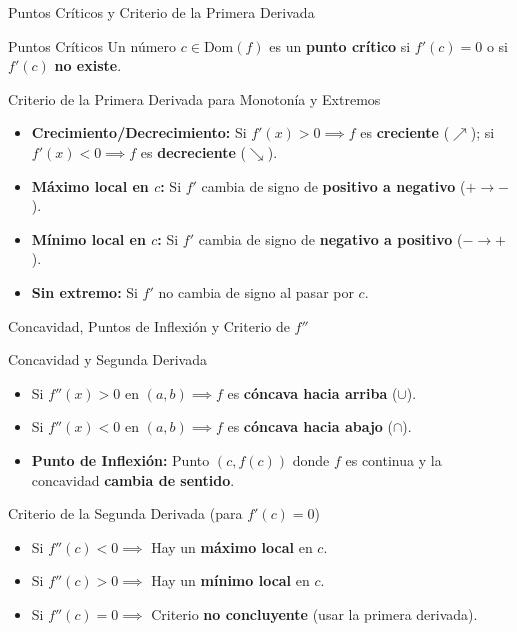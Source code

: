 \documentclass[aspectratio=169]{beamer}
\begin{document}
\begin{frame}{Puntos Críticos y Criterio de la Primera Derivada}
  \begin{block}{Puntos Críticos}
    Un número $c \in \text{Dom}(f)$ es un \textbf{punto crítico} si $f'(c) = 0$ o si $f'(c)$ \textbf{no existe}.
  \end{block}

  \vspace{4pt}
  \begin{block}{Criterio de la Primera Derivada para Monotonía y Extremos}
    \begin{itemize}
      \item \textbf{Crecimiento/Decrecimiento:} Si $f'(x) > 0 \implies f$ es \textbf{creciente} ($\nearrow$); si $f'(x) < 0 \implies f$ es \textbf{decreciente} ($\searrow$).
      \item \textbf{Máximo local en $c$:} Si $f'$ cambia de signo de \textbf{positivo a negativo} ($+ \to -$).
      \item \textbf{Mínimo local en $c$:} Si $f'$ cambia de signo de \textbf{negativo a positivo} ($- \to +$).
      \item \textbf{Sin extremo:} Si $f'$ no cambia de signo al pasar por $c$.
    \end{itemize}
  \end{block}
\end{frame}

\begin{frame}{Concavidad, Puntos de Inflexión y Criterio de $f''$}
  \begin{block}{Concavidad y Segunda Derivada}
    \begin{itemize}
      \item Si $f''(x) > 0$ en $(a, b) \implies f$ es \textbf{cóncava hacia arriba} ($\cup$).
      \item Si $f''(x) < 0$ en $(a, b) \implies f$ es \textbf{cóncava hacia abajo} ($\cap$).
      \item \textbf{Punto de Inflexión:} Punto $(c, f(c))$ donde $f$ es continua y la concavidad \textbf{cambia de sentido}.
    \end{itemize}
  \end{block}

  \vspace{4pt}
  \begin{block}{Criterio de la Segunda Derivada (para $f'(c) = 0$)}
    \begin{itemize}
      \item Si $f''(c) < 0 \implies$ Hay un \textbf{máximo local} en $c$.
      \item Si $f''(c) > 0 \implies$ Hay un \textbf{mínimo local} en $c$.
      \item Si $f''(c) = 0 \implies$ Criterio \textbf{no concluyente} (usar la primera derivada).
    \end{itemize}
  \end{block}
\end{frame}
\end{document}
